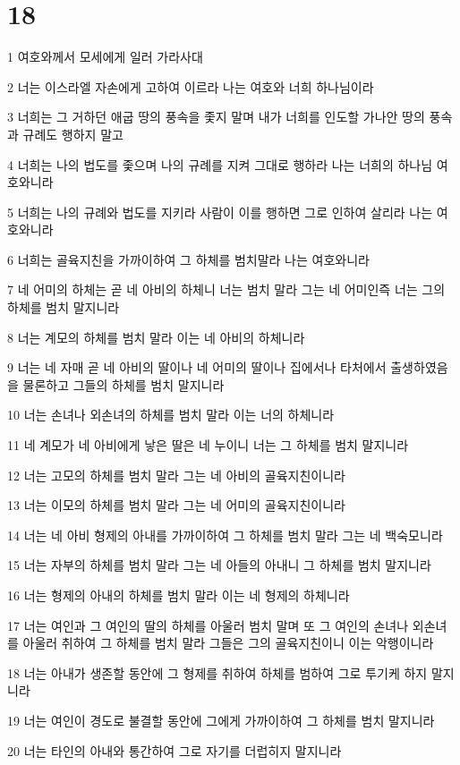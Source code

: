 \chapter{18}

\par 1 여호와께서 모세에게 일러 가라사대
\par 2 너는 이스라엘 자손에게 고하여 이르라 나는 여호와 너희 하나님이라
\par 3 너희는 그 거하던 애굽 땅의 풍속을 좇지 말며 내가 너희를 인도할 가나안 땅의 풍속과 규례도 행하지 말고
\par 4 너희는 나의 법도를 좇으며 나의 규례를 지켜 그대로 행하라 나는 너희의 하나님 여호와니라
\par 5 너희는 나의 규례와 법도를 지키라 사람이 이를 행하면 그로 인하여 살리라 나는 여호와니라
\par 6 너희는 골육지친을 가까이하여 그 하체를 범치말라 나는 여호와니라
\par 7 네 어미의 하체는 곧 네 아비의 하체니 너는 범치 말라 그는 네 어미인즉 너는 그의 하체를 범치 말지니라
\par 8 너는 계모의 하체를 범치 말라 이는 네 아비의 하체니라
\par 9 너는 네 자매 곧 네 아비의 딸이나 네 어미의 딸이나 집에서나 타처에서 출생하였음을 물론하고 그들의 하체를 범치 말지니라
\par 10 너는 손녀나 외손녀의 하체를 범치 말라 이는 너의 하체니라
\par 11 네 계모가 네 아비에게 낳은 딸은 네 누이니 너는 그 하체를 범치 말지니라
\par 12 너는 고모의 하체를 범치 말라 그는 네 아비의 골육지친이니라
\par 13 너는 이모의 하체를 범치 말라 그는 네 어미의 골육지친이니라
\par 14 너는 네 아비 형제의 아내를 가까이하여 그 하체를 범치 말라 그는 네 백숙모니라
\par 15 너는 자부의 하체를 범치 말라 그는 네 아들의 아내니 그 하체를 범치 말지니라
\par 16 너는 형제의 아내의 하체를 범치 말라 이는 네 형제의 하체니라
\par 17 너는 여인과 그 여인의 딸의 하체를 아울러 범치 말며 또 그 여인의 손녀나 외손녀를 아울러 취하여 그 하체를 범치 말라 그들은 그의 골육지친이니 이는 악행이니라
\par 18 너는 아내가 생존할 동안에 그 형제를 취하여 하체를 범하여 그로 투기케 하지 말지니라
\par 19 너는 여인이 경도로 불결할 동안에 그에게 가까이하여 그 하체를 범치 말지니라
\par 20 너는 타인의 아내와 통간하여 그로 자기를 더럽히지 말지니라
